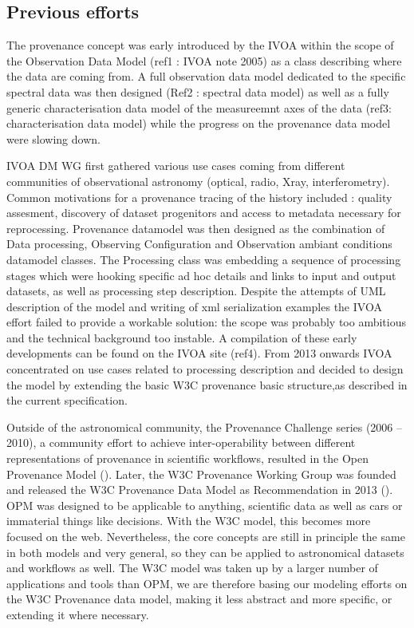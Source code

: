 \subsection{Previous efforts}
The provenance concept was early introduced by the IVOA within the scope of the Observation Data Model (ref1 : IVOA note 2005) as a class  describing where the data are coming from. A full observation data model dedicated to the specific spectral data was then designed (Ref2 : spectral data model) as well as a fully generic characterisation data model of the measureemnt axes of the data (ref3: characterisation data model) while the progress on the provenance data model were slowing down.

IVOA DM WG first gathered various use cases coming from different communities of observational  astronomy (optical,  radio, Xray, interferometry). Common motivations for a provenance tracing of the history included : quality assesment, discovery of dataset progenitors and access to metadata necessary for reprocessing. Provenance datamodel was then designed as the combination of Data processing, Observing Configuration and Observation ambiant conditions datamodel classes. 
The Processing class was embedding a sequence of processing stages which were hooking specific ad hoc details and links to input and output datasets, as well as processing step description. 
Despite the attempts of UML description of the model and writing of xml serialization examples the IVOA effort failed to provide a workable solution:  the scope was probably too ambitious and the technical background too instable. A compilation of these early developments can be found on the IVOA site (ref4). From 2013 onwards IVOA concentrated on use cases related to processing description and decided to design the model  by extending the basic W3C provenance basic structure,as described in the current specification. 

Outside of the astronomical community, the Provenance Challenge series (2006 -- 2010), a community effort to achieve inter-operability between different representations of provenance in scientific workflows, resulted in the Open Provenance Model (\cite{moreau2010}). 
Later, the W3C Provenance Working Group was founded and released the W3C Provenance Data Model as Recommendation in 2013 (\cite{std:W3CProvDM}). 
OPM was designed to be applicable to anything, scientific data as well as cars or immaterial things like decisions. With the W3C model, this becomes more focused on the web.  Nevertheless, the core concepts are still in principle the same in both models and very general, so they can be applied to astronomical datasets and workflows as well. 
The W3C model was taken up by a larger number of applications and tools than OPM, we are therefore basing our modeling efforts on the W3C Provenance data model, making it less abstract and more specific, or extending it where necessary. 


